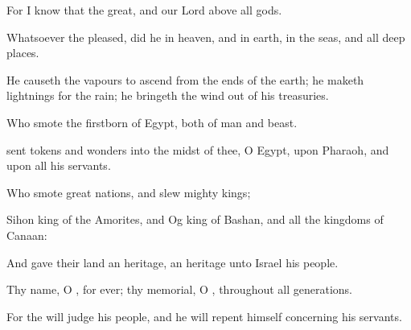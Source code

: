 {\Q {}For I
know that the
{}
{}
great, and
{} our
Lord
{} above all
gods.


\par }{\Q {}Whatsoever the
{}
pleased,
{}
did he in
heaven, and in
earth, in the
seas, and all deep
places.


\par }{\Q {}He causeth the
vapours to
ascend from the
ends of the
earth; he
maketh
lightnings for the
rain; he
bringeth the
wind out of his
treasuries.


\par }{\Q {}Who
smote the
firstborn of
Egypt, both of
man and
beast.


\par }{\Q {}
sent
tokens and
wonders into the
midst of thee, O
Egypt, upon
Pharaoh, and upon all his
servants.


\par }{\Q {}Who
smote
great
nations, and
slew
mighty
kings;


\par }{\Q {}Sihon
king of the
Amorites, and
Og
king of
Bashan, and all the
kingdoms of
Canaan:


\par }{\Q {}And
gave their
land
{} an
heritage, an
heritage unto
Israel his
people.


\par }{\Q {}Thy
name, O
{},
{} for
ever;
{} thy
memorial, O
{}, throughout
all
generations.


\par }{\Q {}For the
{} will
judge his
people, and he will
repent himself concerning his
servants.


\par }{\BB \par }
